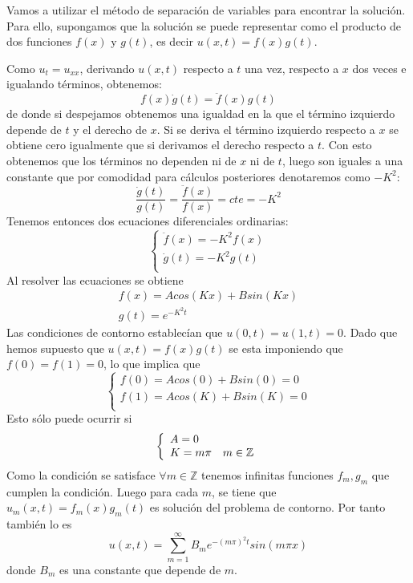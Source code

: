 Vamos a utilizar el método de separación de variables para encontrar la solución. Para ello, supongamos que la solución se puede representar como el producto de dos funciones $f(x)$ y $g(t)$, es decir $u(x,t) = f(x)g(t)$.

Como $u_t = u_{xx}$, derivando $u(x,t)$ respecto a $t$ una vez, respecto a $x$ dos veces e igualando términos, obtenemos:
$$f(x) \dot{g}(t) = \ddot{f}(x) g(t)$$
de donde si despejamos obtenemos una igualdad en la que el término izquierdo depende de $t$ y el derecho de $x$. Si se deriva el término izquierdo respecto a $x$ se obtiene cero igualmente que si derivamos el derecho respecto a $t$. Con esto obtenemos que los términos no dependen ni de $x$ ni de $t$, luego son iguales a una constante que por comodidad para cálculos posteriores denotaremos como $-K^2$:
$$\frac{\dot{g}(t)}{g(t)} = \frac{\ddot{f}(x)}{f(x)} = cte = -K^2$$
Tenemos entonces dos ecuaciones diferenciales ordinarias:
\begin{equation*}
	\left\{
	\begin{array}{l}
		\ddot{f}(x) = -K^2 f(x)\\
		\dot{g}(t) = -K^2 g(t)\\
	\end{array}
	\right.
\end{equation*}
Al resolver las ecuaciones se obtiene
\begin{equation*}
	\begin{array}{l}
		f(x) = Acos(Kx) + Bsin(Kx)\\
		g(t) = e^{-K^2 t}
	\end{array}
\end{equation*}
Las condiciones de contorno establecían que $u(0,t) = u(1,t) = 0$. 
Dado que hemos supuesto que $u(x,t) = f(x)g(t)$ se esta imponiendo que $f(0) = f(1) = 0$, lo que implica que
\begin{equation*}
	\left\{
	\begin{array}{l}
		f(0) = Acos(0) + Bsin(0) = 0\\
		f(1) = Acos(K) + Bsin(K) = 0\\
	\end{array}
	\right.
\end{equation*}
Esto sólo puede ocurrir si
\begin{equation*}
	\left\{
	\begin{array}{l l}
		A = 0 & \\
		K = m\pi & m\in\mathbb{Z}\\
	\end{array}
	\right.
\end{equation*}
Como la condición se satisface $\forall m \in \mathbb{Z}$ tenemos infinitas funciones $f_m, g_m$ que cumplen la condición. Luego para cada $m$, se tiene que $u_m(x,t) = f_m(x)g_m(t)$ es solución del problema de contorno.
Por tanto también lo es
$$u(x,t) = \sum_{m=1}^\infty B_m e^{-(m\pi)^2 t} sin(m\pi x)$$
donde $B_m$ es una constante que depende de $m$.

